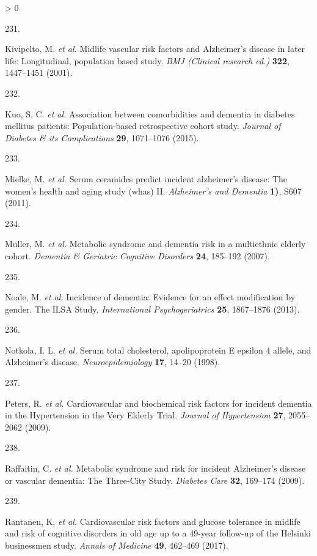 \documentclass[a4paper, twoside]{templates/ociamthesis}
\newlength{\cslhangindent}
\newlength{\csllabelwidth}
\newenvironment{CSLReferences}[3] %
 {%
  \setlength{\parindent}{0pt}
  \ifodd #1 \everypar{\setlength{\hangindent}{\cslhangindent}}\ignorespaces\fi
  \ifnum #2 > 0
  \setlength{\parskip}{#2\baselineskip}
  \fi
 }%
 {}
\newcommand{\CSLLeftMargin}[1]{\parbox[t]{\maxof{\widthof{#1}}{\csllabelwidth}}{#1}}
\newcommand{\CSLRightInline}[1]{\parbox[t]{\linewidth - \csllabelwidth}{#1}}
\begin{document}
\begin{CSLReferences}{0}{0}
\leavevmode\hypertarget{ref-kivipelto2001}{}%
\CSLLeftMargin{231. }
\CSLRightInline{Kivipelto, M. \emph{et al.} Midlife vascular risk factors and {Alzheimer}'s disease in later life: Longitudinal, population based study. \emph{BMJ (Clinical research ed.)} \textbf{322}, 1447--1451 (2001).}

\leavevmode\hypertarget{ref-kuo2015}{}%
\CSLLeftMargin{232. }
\CSLRightInline{Kuo, S. C. \emph{et al.} Association between comorbidities and dementia in diabetes mellitus patients: Population-based retrospective cohort study. \emph{Journal of Diabetes \& its Complications} \textbf{29}, 1071--1076 (2015).}

\leavevmode\hypertarget{ref-mielke2011}{}%
\CSLLeftMargin{233. }
\CSLRightInline{Mielke, M. \emph{et al.} Serum ceramides predict incident alzheimer's disease: The women's health and aging study (whas) {II}. \emph{Alzheimer's and Dementia} \textbf{1)}, S607 (2011).}

\leavevmode\hypertarget{ref-muller2007}{}%
\CSLLeftMargin{234. }
\CSLRightInline{Muller, M. \emph{et al.} Metabolic syndrome and dementia risk in a multiethnic elderly cohort. \emph{Dementia \& Geriatric Cognitive Disorders} \textbf{24}, 185--192 (2007).}

\leavevmode\hypertarget{ref-noale2013}{}%
\CSLLeftMargin{235. }
\CSLRightInline{Noale, M. \emph{et al.} Incidence of dementia: Evidence for an effect modification by gender. {The ILSA Study}. \emph{International Psychogeriatrics} \textbf{25}, 1867--1876 (2013).}

\leavevmode\hypertarget{ref-notkola1998}{}%
\CSLLeftMargin{236. }
\CSLRightInline{Notkola, I. L. \emph{et al.} Serum total cholesterol, apolipoprotein {E} epsilon 4 allele, and {Alzheimer}'s disease. \emph{Neuroepidemiology} \textbf{17}, 14--20 (1998).}

\leavevmode\hypertarget{ref-peters2009}{}%
\CSLLeftMargin{237. }
\CSLRightInline{Peters, R. \emph{et al.} Cardiovascular and biochemical risk factors for incident dementia in the {Hypertension} in the {Very Elderly Trial}. \emph{Journal of Hypertension} \textbf{27}, 2055--2062 (2009).}

\leavevmode\hypertarget{ref-raffaitin2009}{}%
\CSLLeftMargin{238. }
\CSLRightInline{Raffaitin, C. \emph{et al.} Metabolic syndrome and risk for incident {Alzheimer}'s disease or vascular dementia: The {Three}-{City Study}. \emph{Diabetes Care} \textbf{32}, 169--174 (2009).}

\leavevmode\hypertarget{ref-rantanen2017}{}%
\CSLLeftMargin{239. }
\CSLRightInline{Rantanen, K. \emph{et al.} Cardiovascular risk factors and glucose tolerance in midlife and risk of cognitive disorders in old age up to a 49-year follow-up of the {Helsinki} businessmen study. \emph{Annals of Medicine} \textbf{49}, 462--469 (2017).}


\end{CSLReferences}
\end{document}
